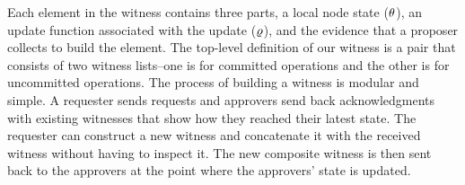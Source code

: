 Each element in the witness contains three parts, a local node state ($\theta$), an update function associated with the update ($\varrho$), and the evidence that a proposer collects to build the element. 
The top-level definition of our witness is a pair that consists of two witness lists--one is for committed operations and the other is for uncommitted operations.
The process of building a witness is modular and simple. A requester sends
requests and approvers send back acknowledgments with existing witnesses that
show how they reached their latest state.
The requester can construct a new witness and concatenate it with the
received witness without having to inspect it.
The new composite witness is then sent back to the approvers at the point where
the approvers' state is updated.


%
%
%
%
%
%
%

